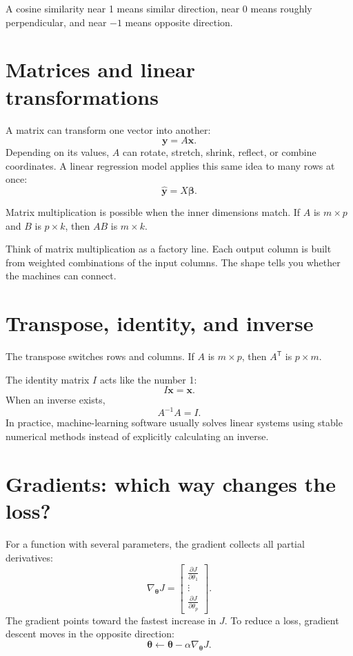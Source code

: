 A cosine similarity near 1 means similar direction, near 0 means roughly perpendicular, and near $-1$ means opposite direction.

\section{Matrices and linear transformations}

A matrix can transform one vector into another:
\[
  \bm{y}=A\bm{x}.
\]
Depending on its values, $A$ can rotate, stretch, shrink, reflect, or combine coordinates. A linear regression model applies this same idea to many rows at once:
\[
  \hat{\bm{y}}=X\bm{\beta}.
\]

Matrix multiplication is possible when the inner dimensions match. If $A$ is $m\times p$ and $B$ is $p\times k$, then $AB$ is $m\times k$.

\begin{intuition}
Think of matrix multiplication as a factory line. Each output column is built from weighted combinations of the input columns. The shape tells you whether the machines can connect.
\end{intuition}

\section{Transpose, identity, and inverse}

The transpose switches rows and columns. If $A$ is $m\times p$, then $A^{\mathsf T}$ is $p\times m$.

The identity matrix $I$ acts like the number 1:
\[
  I\bm{x}=\bm{x}.
\]
When an inverse exists,
\[
  A^{-1}A=I.
\]
In practice, machine-learning software usually solves linear systems using stable numerical methods instead of explicitly calculating an inverse.

\section{Gradients: which way changes the loss?}

For a function with several parameters, the gradient collects all partial derivatives:
\[
  \nabla_{\bm{\theta}}J=
  \begin{bmatrix}
  \frac{\partial J}{\partial\theta_1}\\
  \vdots\\
  \frac{\partial J}{\partial\theta_p}
  \end{bmatrix}.
\]
The gradient points toward the fastest increase in $J$. To reduce a loss, gradient descent moves in the opposite direction:
\[
  \bm{\theta}\leftarrow\bm{\theta}-\alpha\nabla_{\bm{\theta}}J.
\]

